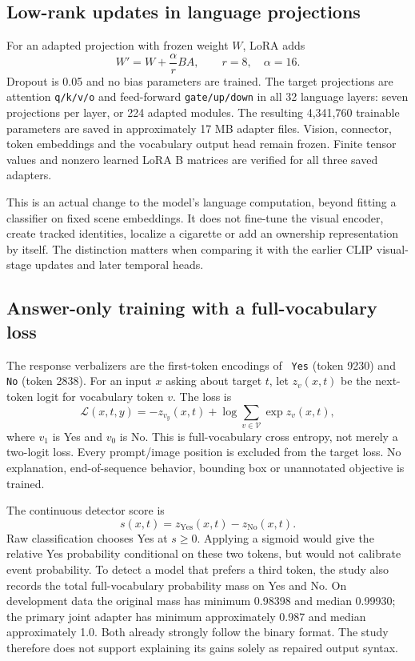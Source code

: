 \subsection{Low-rank updates in language projections}
For an adapted projection with frozen weight $W$, LoRA adds
\begin{equation}
W' = W + \frac{\alpha}{r}BA,\qquad r=8,\quad \alpha=16.
\end{equation}
Dropout is 0.05 and no bias parameters are trained. The target projections are attention \texttt{q/k/v/o} and feed-forward \texttt{gate/up/down} in all 32 language layers: seven projections per layer, or 224 adapted modules. The resulting 4,341,760 trainable parameters are saved in approximately 17 MB adapter files. Vision, connector, token embeddings and the vocabulary output head remain frozen. Finite tensor values and nonzero learned LoRA B matrices are verified for all three saved adapters.

This is an actual change to the model's language computation, beyond fitting a classifier on fixed scene embeddings. It does not fine-tune the visual encoder, create tracked identities, localize a cigarette or add an ownership representation by itself. The distinction matters when comparing it with the earlier CLIP visual-stage updates and later temporal heads.

\subsection{Answer-only training with a full-vocabulary loss}
The response verbalizers are the first-token encodings of \texttt{ Yes} (token 9230) and \texttt{ No} (token 2838). For an input $x$ asking about target $t$, let $z_v(x,t)$ be the next-token logit for vocabulary token $v$. The loss is
\begin{equation}
\mathcal{L}(x,t,y)=-z_{v_y}(x,t)+\log\sum_{v\in\mathcal V}\exp z_v(x,t),
\end{equation}
where $v_1$ is Yes and $v_0$ is No. This is full-vocabulary cross entropy, not merely a two-logit loss. Every prompt/image position is excluded from the target loss. No explanation, end-of-sequence behavior, bounding box or unannotated objective is trained.

The continuous detector score is
\begin{equation}
s(x,t)=z_{\mathrm{Yes}}(x,t)-z_{\mathrm{No}}(x,t).
\end{equation}
Raw classification chooses Yes at $s\geq0$. Applying a sigmoid would give the relative Yes probability conditional on these two tokens, but would not calibrate event probability. To detect a model that prefers a third token, the study also records the total full-vocabulary probability mass on Yes and No. On development data the original mass has minimum 0.98398 and median 0.99930; the primary joint adapter has minimum approximately 0.987 and median approximately 1.0. Both already strongly follow the binary format. The study therefore does not support explaining its gains solely as repaired output syntax.


